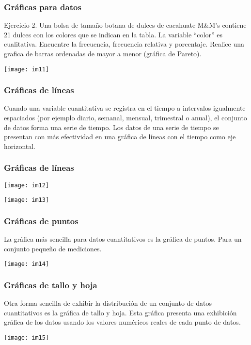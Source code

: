 \documentclass[spanish]{beamer}
\begin{document}
\begin{frame}
\frametitle{Gráficas para datos}
Ejercicio 2. Una bolsa de tamaño botana de dulces de cacahuate M\&M’s contiene 21 dulces con los colores que se indican en la tabla. La variable “color” es cualitativa. Encuentre la frecuencia, frecuencia relativa y porcentaje. Realice una grafica de barras ordenadas de mayor a menor (gráfica de Pareto).
\begin{center}
\texttt{[image: im11]}
\end{center}

\end{frame}
\begin{frame}
\frametitle{Gráficas de líneas}
Cuando una variable cuantitativa se registra en el tiempo a intervalos igualmente espaciados (por ejemplo diario, semanal, mensual, trimestral o anual), el conjunto de datos forma una serie de tiempo. Los datos de una serie de tiempo se presentan con más efectividad en una gráfica de líneas con el tiempo como eje horizontal.
\end{frame}
\begin{frame}
\frametitle{Gráficas de líneas}
\begin{center}
\texttt{[image: im12]}
\end{center}
\begin{center}
\texttt{[image: im13]}
\end{center}
\end{frame}
\begin{frame}
\frametitle{Gráficas de puntos}
La gráfica más sencilla para datos cuantitativos es la gráfica de puntos. Para un conjunto pequeño de mediciones. 
\begin{center}
\texttt{[image: im14]}
\end{center}
\end{frame}
\begin{frame}
\frametitle{Gráficas de tallo y hoja}
Otra forma sencilla de exhibir la distribución de un conjunto de datos cuantitativos es la gráfica de tallo y hoja. Esta gráfica presenta una exhibición gráfica de los datos usando los valores numéricos reales de cada punto de datos.

\begin{center}
\texttt{[image: im15]}
\end{center}
\end{frame}
\end{document}
